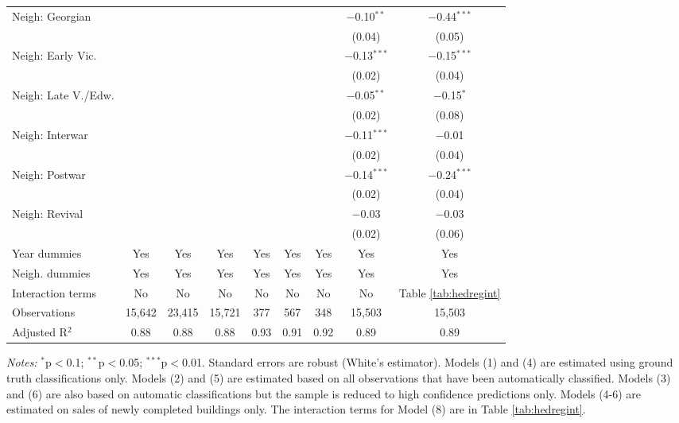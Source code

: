\documentclass[]{article}
\begin{document}
\begin{table}[!htbp]
\begin{tabular}{@{\extracolsep{5pt}}lcccccccc}
   Neigh: Georgian &  &  &  &  &  &  & $-$0.10$^{**}$ & $-$0.44$^{***}$ \\ 
  &  &  &  &  &  &  & (0.04) & (0.05) \\ 
  Neigh: Early Vic. &  &  &  &  &  &  & $-$0.13$^{***}$ & $-$0.15$^{***}$ \\ 
  &  &  &  &  &  &  & (0.02) & (0.04) \\ 
  Neigh: Late V./Edw. &  &  &  &  &  &  & $-$0.05$^{**}$ & $-$0.15$^{*}$ \\ 
  &  &  &  &  &  &  & (0.02) & (0.08) \\ 
  Neigh: Interwar &  &  &  &  &  &  & $-$0.11$^{***}$ & $-$0.01 \\ 
  &  &  &  &  &  &  & (0.02) & (0.04) \\ 
  Neigh: Postwar &  &  &  &  &  &  & $-$0.14$^{***}$ & $-$0.24$^{***}$ \\ 
  &  &  &  &  &  &  & (0.02) & (0.04) \\ 
  Neigh: Revival &  &  &  &  &  &  & $-$0.03 & $-$0.03 \\ 
  &  &  &  &  &  &  & (0.02) & (0.06) \\  
\midrule
Year dummies & Yes & Yes & Yes & Yes & Yes & Yes & Yes & Yes \\ 
Neigh. dummies & Yes & Yes & Yes & Yes & Yes & Yes & Yes & Yes \\ 
Interaction terms & No & No & No & No & No & No & No & Table \ref{tab:hedregint} \\ 
Observations & 15,642 & 23,415 & 15,721 & 377 & 567 & 348 & 15,503 & 15,503 \\ 
Adjusted R$^{2}$ & 0.88 & 0.88 & 0.88 & 0.93 & 0.91 & 0.92 & 0.89 & 0.89 \\ 
\bottomrule
\end{tabular} 
\begin{minipage}{\textwidth}
\vspace{0.25cm}
\footnotesize \emph{Notes:} $^{*}$p$<$0.1; $^{**}$p$<$0.05; $^{***}$p$<$0.01. Standard errors are robust (White's estimator). Models (1) and (4) are estimated using ground truth classifications only. Models (2) and (5) are estimated based on all observations that have been automatically classified. Models (3) and (6) are also based on automatic classifications but the sample is reduced to high confidence predictions only. Models (4-6) are estimated on sales of newly completed buildings only. The interaction terms for Model (8) are in Table \ref{tab:hedregint}.  
\end{minipage}
\end{table}
\end{document}
